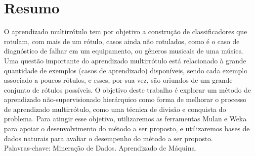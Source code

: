 
\chapter*{Resumo}

O aprendizado multirrótulo tem por objetivo a construção de classificadores que rotulam, com mais de um rótulo, casos ainda não rotulados, como é o caso de diagnóstico de falhar em um equipamento, ou gêneros musicais de uma música. Uma questão importante do aprendizado multirrótulo está relacionado à grande quantidade de exemplos (casos de aprendizado) disponíveis, sendo cada exemplo associado a poucos rótulos, e esses, por sua vez, são oriundos de um grande conjunto de rótulos possíveis. O objetivo deste trabalho é explorar um método de aprendizado não-supervisionado hierárquico como forma de melhorar o processo de aprendizado multirrótulo, como uma técnica de divisão e conquista do problema. 
Para atingir esse objetivo, utilizaremos as ferramentas Mulan e Weka para apoiar o desenvolvimento do método a ser proposto, e utilizaremos bases de dados naturais para avaliar o desempenho do método a ser proposto.\\

Palavras-chave: Mineração de Dados. Aprendizado de Máquina. 
